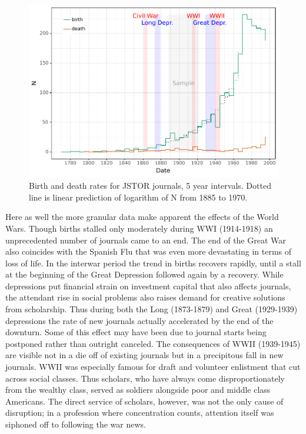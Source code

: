 \documentclass[]{book}
\theoremstyle{definition}
\theoremstyle{definition}
\theoremstyle{definition}
\theoremstyle{remark}
\begin{document}
\begin{figure}

{\centering \includegraphics[width=0.9\linewidth]{04_files/figure-latex/jbdp-1} 

}

\caption{Birth and death rates for JSTOR journals, 5 year intervals. Dotted line is linear prediction of logarithm of N from 1885 to 1970.}\label{fig:jbdp}
\end{figure}

Here as well the more granular data make apparent the effects of the
World Wars. Though births stalled only moderately during WWI (1914-1918)
an unprecedented number of journals came to an end. The end of the Great
War also coincides with the Spanish Flu that was even more devastating
in terms of loss of life. In the interwar period the trend in births
recovers rapidly, until a stall at the beginning of the Great Depression
followed again by a recovery. While depressions put financial strain on
investment capital that also affects journals, the attendant rise in
social problems also raises demand for creative solutions from
scholarship. Thus during both the Long (1873-1879) and Great (1929-1939)
depressions the rate of new journals actually accelerated by the end of
the downturn. Some of this effect may have been due to journal starts
being postponed rather than outright canceled. The consequences of WWII
(1939-1945) are visible not in a die off of existing journals but in a
precipitous fall in new journals. WWII was especially famous for draft
and volunteer enlistment that cut across social classes. Thus scholars,
who have always come disproportionately from the wealthy class, served
as soldiers alongside poor and middle class Americans. The direct
service of scholars, however, was not the only cause of disruption; in a
profession where concentration counts, attention itself was siphoned off
to following the war news.
\end{document}
